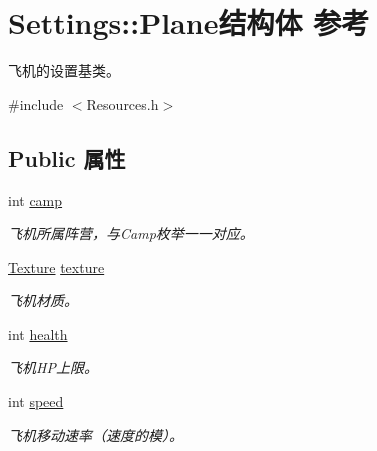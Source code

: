 \hypertarget{struct_settings_1_1_plane}{}\section{Settings\+:\+:Plane结构体 参考}
\label{struct_settings_1_1_plane}


飞机的设置基类。  




{\ttfamily \#include $<$Resources.\+h$>$}

\subsection*{Public 属性}
\begin{DoxyCompactItemize}
\item 
\mbox{\label{struct_settings_1_1_plane_a62d563a2ebc841e01bfe4737bf1fe0ab}} 
int \hyperlink{struct_settings_1_1_plane_a62d563a2ebc841e01bfe4737bf1fe0ab}{camp}
\begin{DoxyCompactList}\small\item\em 飞机所属阵营，与\+Camp枚举一一对应。 \end{DoxyCompactList}\item 
\mbox{\label{struct_settings_1_1_plane_a6a000124604eb5435f4d77bbec170a4f}} 
\hyperlink{struct_texture}{Texture} \hyperlink{struct_settings_1_1_plane_a6a000124604eb5435f4d77bbec170a4f}{texture}
\begin{DoxyCompactList}\small\item\em 飞机材质。 \end{DoxyCompactList}\item 
\mbox{\label{struct_settings_1_1_plane_a71ffa9166855277d353d0fb6ac8f58f6}} 
int \hyperlink{struct_settings_1_1_plane_a71ffa9166855277d353d0fb6ac8f58f6}{health}
\begin{DoxyCompactList}\small\item\em 飞机\+H\+P上限。 \end{DoxyCompactList}\item 
\mbox{\label{struct_settings_1_1_plane_a814ee5fe2c6b873ff4f0e0208f2c240a}} 
int \hyperlink{struct_settings_1_1_plane_a814ee5fe2c6b873ff4f0e0208f2c240a}{speed}
\begin{DoxyCompactList}\small\item\em 飞机移动速率（速度的模）。 \end{DoxyCompactList}\item 

\end{DoxyCompactItemize}
